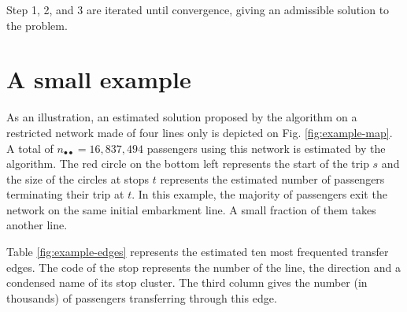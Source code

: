 \documentclass{bmcart}
\begin{document}
Step 1, 2, and 3 are iterated until convergence, giving an admissible solution to the problem.
%
\section{A small example}
%

As an illustration, an estimated solution proposed by the algorithm on a restricted network made of four lines only is depicted on Fig. \ref{fig:example-map}. A total of $n_{\bullet \bullet} = 16,837,494$ passengers using this network is estimated by the algorithm. The red circle on the bottom left represents the start of the trip $s$ and the size of the circles at stops $t$ represents the estimated number of passengers terminating their trip at $t$. In this example, the majority of passengers exit the network on the same initial embarkment line. A small fraction of them takes another line. 

Table \ref{fig:example-edges} represents the estimated ten most frequented transfer edges. The code of the stop represents the number of the line, the direction and a condensed name of its stop cluster. The third column gives the number (in thousands) of passengers transferring through this edge.
\end{document}

